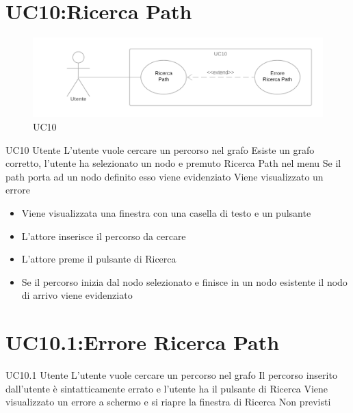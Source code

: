 \documentclass[../AnalisideiRequisiti.tex]{subfiles}
\begin{document}
\section{UC10:Ricerca Path}
\begin{figure}[H]
	\caption{UC10}
	\centering
	\includegraphics[width=\textwidth]{../img/UC10.png}
\end{figure}
\UserCase
{UC10}
{Utente}
{}
{L'utente vuole cercare un percorso nel grafo}
{Esiste un grafo corretto, l'utente ha selezionato un nodo e premuto Ricerca Path nel menu}
{Se il path porta ad un nodo definito esso viene evidenziato }
{Viene visualizzato un errore }
{
	\begin{itemize}
		\item{} Viene visualizzata una finestra con una casella di testo e un pulsante
		\item{} L'attore inserisce il percorso da cercare
		\item{} L'attore preme il pulsante di Ricerca
		\item{} Se il percorso inizia dal nodo selezionato e finisce in un nodo esistente il nodo di arrivo viene evidenziato 
 	\end{itemize}
}

\section{UC10.1:Errore Ricerca Path}
\UserCase
{UC10.1}
{Utente}
{}
{L'utente vuole cercare un percorso nel grafo}
{Il percorso inserito dall'utente è sintatticamente errato e l'utente ha il pulsante di Ricerca}
{Viene visualizzato un errore a schermo e si riapre la finestra di Ricerca }
{Non previsti}
{}
\end{document}
